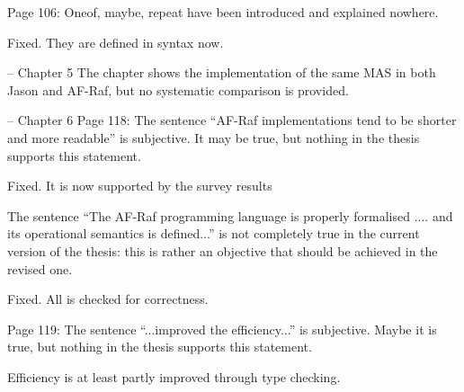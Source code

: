 \documentclass{article}
\newcommand{\todo}[1]{[\textcolor{red}{TODO}: #1]}
\newenvironment{them}{\noindent\begingroup\color{blue}}{\endgroup\par}
\begin{document}
\begin{them}

Page 106:
Oneof, maybe, repeat have been introduced and explained nowhere.
\end{them}
Fixed. They are defined in syntax now.

\begin{them}

-- Chapter 5
The chapter shows the implementation of the same MAS in both Jason and AF-Raf,
but no systematic comparison is provided.

\end{them}
\todo{}

\begin{them}

-- Chapter 6
Page 118:
The sentence “AF-Raf implementations tend to be shorter and more readable” is
subjective. It may be true, but nothing in the thesis supports this statement.

\end{them}
Fixed. It is now supported by the survey results

\begin{them}

The sentence “The AF-Raf programming language is properly formalised .... and
its operational semantics is defined...” is not completely true in the current
version of the thesis: this is rather an objective that should be achieved in
the revised one.

\end{them}
Fixed. All is checked for correctness.

\begin{them}

Page 119:
The sentence “...improved the efficiency...” is subjective. Maybe it is true,
but nothing in the thesis supports this statement.

\end{them}
Efficiency is at least partly improved through type checking.
\end{document}
